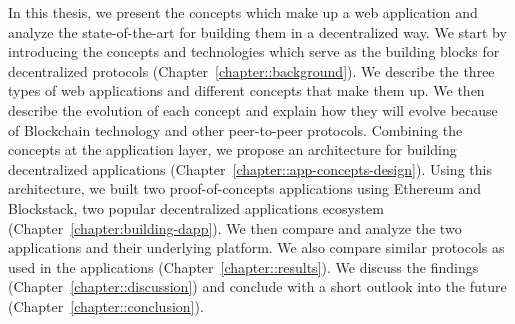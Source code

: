 In this thesis, we present the concepts which make up a web application and analyze the state-of-the-art for building them in a decentralized way. We start by introducing the concepts and technologies which serve as the building blocks for decentralized protocols (Chapter~\ref{chapter::background}). We describe the three types of web applications and different concepts that make them up. We then describe the evolution of each concept and explain how they will evolve because of Blockchain technology and other peer-to-peer protocols. Combining the concepts at the application layer, we propose an architecture for building decentralized applications (Chapter~\ref{chapter::app-concepts-design}). Using this architecture, we built two proof-of-concepts applications using Ethereum and Blockstack, two popular decentralized applications ecosystem (Chapter~\ref{chapter:building-dapp}). We then compare and analyze the two applications and their underlying platform. We also compare similar protocols as used in the applications (Chapter~\ref{chapter::results}). We discuss the findings (Chapter~\ref{chapter::discussion}) and conclude with a short outlook into the future (Chapter~\ref{chapter::conclusion}).
